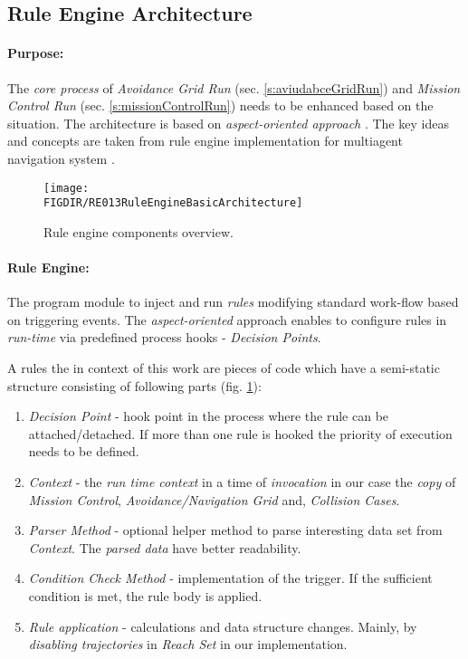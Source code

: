 \subsection{Rule Engine Architecture}\label{s:RuleEngineArchitecture}

\paragraph{Purpose:} The \emph{core process} of \emph{Avoidance Grid Run} (sec. \ref{s:aviudabceGridRun}) and \emph{Mission Control Run} (sec. \ref{s:missionControlRun}) needs to be enhanced based on  the situation. The architecture is based on \emph{aspect-oriented approach} \cite{hill2003jess}. The key ideas and concepts are taken from rule engine implementation for multiagent  navigation system \cite{seyboth2013event}.

\begin{figure}[H]
    \centering
    \texttt{[image: \\FIGDIR/RE013RuleEngineBasicArchitecture]}
    \caption{Rule engine components overview.}
    \label{fig:RuleEngineBasicArchitecture}
\end{figure}

\paragraph{Rule Engine:} The program module to inject and run \emph{rules} modifying standard work-flow based on  triggering events. The \emph{aspect-oriented} approach enables to configure rules in \emph{run-time} via predefined process hooks - \emph{Decision Points}. 

\noindent A rules the in context of this work are pieces of code which have a semi-static structure consisting of following parts (fig. \ref{fig:RuleEngineBasicArchitecture}):

\begin{enumerate}
    \item \emph{Decision Point} - hook point in the process where the rule can be attached/detached. If more than one rule is hooked the priority of execution needs to be defined. 
    
    \item \emph{Context} - the \emph{run time context} in a time of \emph{invocation} in our case the \emph{copy} of \emph{Mission Control}, \emph{Avoidance/Navigation Grid} and,  \emph{Collision Cases}.
    
    \item \emph{Parser Method} - optional helper method to parse interesting data set from \emph{Context}. The \emph{parsed data} have better readability.
    
    \item \emph{Condition Check Method} - implementation of the trigger. If the sufficient condition is met, the rule body is applied.
    
    \item \emph{Rule application} - calculations and data structure changes. Mainly, by  \emph{disabling trajectories} in \emph{Reach Set} in our implementation.     
\end{enumerate}

